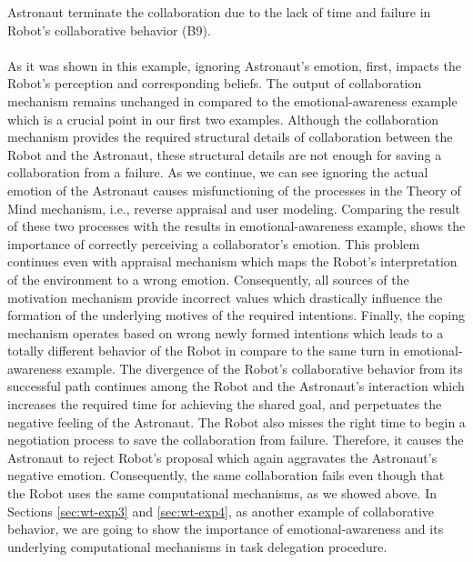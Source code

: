 Astronaut terminate the collaboration due to the lack of time and failure in
Robot's collaborative behavior (B9).\\

\noindent{}\\

As it was shown in this example, ignoring Astronaut's emotion, first, impacts
the Robot's perception and corresponding beliefs. The output of collaboration
mechanism remains unchanged in compared to the emotional-awareness example which
is a crucial point in our first two examples. Although the collaboration
mechanism provides the required structural details of collaboration between the
Robot and the Astronaut, these structural details are not enough for saving a
collaboration from a failure. As we continue, we can see ignoring the actual
emotion of the Astronaut causes misfunctioning of the processes in the Theory of
Mind mechanism, i.e., reverse appraisal and user modeling. Comparing the result
of these two processes with the results in emotional-awareness example, shows
the importance of correctly perceiving a collaborator's emotion. This problem
continues even with appraisal mechanism which maps the Robot's interpretation of
the environment to a wrong emotion. Consequently, all sources of the motivation
mechanism provide incorrect values which drastically influence the formation of
the underlying motives of the required intentions. Finally, the coping mechanism
operates based on wrong newly formed intentions which leads to a totally
different behavior of the Robot in compare to the same turn in
emotional-awareness example. The divergence of the Robot's collaborative
behavior from its successful path continues among the Robot and the Astronaut's
interaction which increases the required time for achieving the shared goal, and
perpetuates the negative feeling of the Astronaut. The Robot also misses the
right time to begin a negotiation process to save the collaboration from
failure. Therefore, it causes the Astronaut to reject Robot's proposal which
again aggravates the Astronaut's negative emotion. Consequently, the same
collaboration fails even though that the Robot uses the same computational
mechanisms, as we showed above. In Sections \ref{sec:wt-exp3} and
\ref{sec:wt-exp4}, as another example of collaborative behavior, we are going to
show the importance of emotional-awareness and its underlying computational
mechanisms in task delegation procedure.

